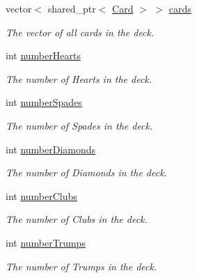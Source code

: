 \begin{DoxyCompactItemize}
\item 
\hypertarget{classDeck_a6b1a1cb4731888fe92e381dd74eb1e16}{vector$<$ shared\-\_\-ptr$<$ \hyperlink{classCard}{\-Card} $>$ $>$ \hyperlink{classDeck_a6b1a1cb4731888fe92e381dd74eb1e16}{cards}}\label{classDeck_a6b1a1cb4731888fe92e381dd74eb1e16}

\begin{DoxyCompactList}\small\item\em \-The vector of all cards in the deck. \end{DoxyCompactList}\item 
\hypertarget{classDeck_ac42ed01da688a430609cac03c00b2a5a}{int \hyperlink{classDeck_ac42ed01da688a430609cac03c00b2a5a}{number\-Hearts}}\label{classDeck_ac42ed01da688a430609cac03c00b2a5a}

\begin{DoxyCompactList}\small\item\em \-The number of \-Hearts in the deck. \end{DoxyCompactList}\item 
\hypertarget{classDeck_a3f3e1163d62a3e6136d2a1104b93f80d}{int \hyperlink{classDeck_a3f3e1163d62a3e6136d2a1104b93f80d}{number\-Spades}}\label{classDeck_a3f3e1163d62a3e6136d2a1104b93f80d}

\begin{DoxyCompactList}\small\item\em \-The number of \-Spades in the deck. \end{DoxyCompactList}\item 
\hypertarget{classDeck_ac36c6f248cf951b54580d6eba0734e3b}{int \hyperlink{classDeck_ac36c6f248cf951b54580d6eba0734e3b}{number\-Diamonds}}\label{classDeck_ac36c6f248cf951b54580d6eba0734e3b}

\begin{DoxyCompactList}\small\item\em \-The number of \-Diamonds in the deck. \end{DoxyCompactList}\item 
\hypertarget{classDeck_af3ff1d8bc6de0cc05a1fe64b5c70b38a}{int \hyperlink{classDeck_af3ff1d8bc6de0cc05a1fe64b5c70b38a}{number\-Clubs}}\label{classDeck_af3ff1d8bc6de0cc05a1fe64b5c70b38a}

\begin{DoxyCompactList}\small\item\em \-The number of \-Clubs in the deck. \end{DoxyCompactList}\item 
\hypertarget{classDeck_a7ddd8527b161887e1ae4023e371c1093}{int \hyperlink{classDeck_a7ddd8527b161887e1ae4023e371c1093}{number\-Trumps}}\label{classDeck_a7ddd8527b161887e1ae4023e371c1093}

\begin{DoxyCompactList}\small\item\em \-The number of \-Trumps in the deck. \end{DoxyCompactList}\end{DoxyCompactItemize}


